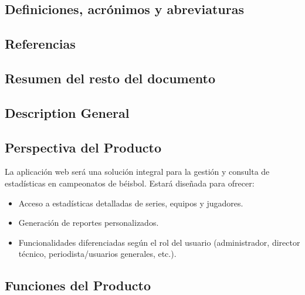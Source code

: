 \documentclass{report}
\begin{document}
        \subsection*{Definiciones, acrónimos y abreviaturas}

        \subsection*{Referencias}

        \subsection*{Resumen del resto del documento}


    \newpage

    \begin{center}
        \section*{Description General}
    \end{center}

        \subsection*{Perspectiva del Producto}
        La aplicación web será una solución integral para la gestión y consulta de estadísticas en campeonatos de 
        béisbol. Estará diseñada para ofrecer:
        \begin{itemize}
            \item Acceso a estadísticas detalladas de series, equipos y jugadores.
            \item Generación de reportes personalizados.
            \item Funcionalidades diferenciadas según el rol del usuario (administrador, director técnico, 
            periodista/usuarios generales, etc.).
        \end{itemize}

        \subsection*{Funciones del Producto}
        
\end{document}
